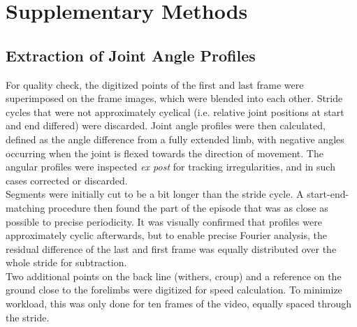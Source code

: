 \documentclass[10pt, a4paper]{article}
\newcommand{\beginsupplement}{%
        \setcounter{table}{0}
        \renewcommand{\thetable}{S\arabic{table}}%
        \setcounter{figure}{0}
        \renewcommand{\thefigure}{S\arabic{figure}}%
     }
\begin{document}


\pagebreak




\FloatBarrier
\pagebreak
\beginsupplement

\section{Supplementary Methods}
\subsection{Extraction of Joint Angle Profiles}\label{apdx:digitization}
For quality check, the digitized points of the first and last frame were superimposed on the frame images, which were blended into each other. 
Stride cycles that were not approximately cyclical (i.e. relative joint positions at start and end differed) were discarded. 
Joint angle profiles were then calculated, defined as the angle difference from a fully extended limb, with negative angles occurring when the joint is flexed towards the direction of movement. 
The angular profiles were inspected \textit{ex post} for tracking irregularities, and in such cases corrected or discarded. 
\\Segments were initially cut to be a bit longer than the stride cycle. 
A start-end-matching procedure then found the part of the episode that was as close as possible to precise periodicity. 
It was visually confirmed that profiles were approximately cyclic afterwards, but to enable precise Fourier analysis, the residual difference of the last and first frame was equally distributed over the whole stride for subtraction. 
\\Two additional points on the back line (withers, croup) and a reference on the ground close to the forelimbs were digitized for speed calculation. 
To minimize workload, this was only done for ten frames of the video, equally spaced through the stride. 
\end{document}
